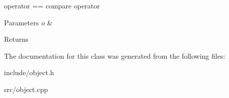 operator == compare operator 


\begin{DoxyParams}{Parameters}
{\em o} & \\
\hline
\end{DoxyParams}
\begin{DoxyReturn}{Returns}

\end{DoxyReturn}


The documentation for this class was generated from the following files\+:\begin{DoxyCompactItemize}
\item 
include/object.\+h\item 
src/object.\+cpp\end{DoxyCompactItemize}
